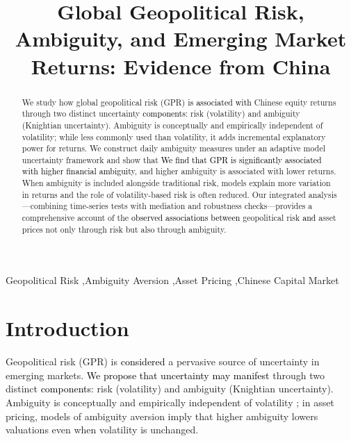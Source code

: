 \documentclass[preprint,12pt,authoryear]{elsarticle}
\begin{document}
\begin{frontmatter}

\title{Global Geopolitical Risk, Ambiguity, and Emerging Market Returns: Evidence from China}

\begin{abstract}
We study how global geopolitical risk (GPR) \textcolor{black}{is associated with} Chinese equity returns through two distinct uncertainty \textcolor{black}{components}: risk (volatility) and ambiguity (Knightian uncertainty). Ambiguity is conceptually and empirically independent of volatility; while less commonly used than volatility, it adds incremental explanatory power for returns. We construct daily ambiguity measures under an adaptive model uncertainty framework and show that \textcolor{black}{We find that GPR is significantly associated with higher financial ambiguity}, and higher ambiguity is associated with lower returns. When ambiguity is included alongside traditional risk, models explain more variation in returns and the role of volatility-based risk is often reduced. Our integrated analysis—combining time-series tests with mediation and robustness checks—provides a comprehensive account of the \textcolor{black}{observed associations between} geopolitical risk \textcolor{black}{and} asset prices not only through risk but also through ambiguity.
\end{abstract}

\begin{keyword}
Geopolitical Risk \sep Ambiguity Aversion \sep Asset Pricing \sep Chinese Capital Market 
\end{keyword}

\end{frontmatter}

\section{Introduction}

Geopolitical risk (GPR) is \textcolor{black}{considered} a pervasive source of uncertainty in emerging markets. \textcolor{black}{We propose that uncertainty may manifest} through two distinct \textcolor{black}{components}: risk (volatility) and ambiguity (Knightian uncertainty). Ambiguity is conceptually and empirically independent of volatility \citep{Knight1921, Ellsberg1961}; in asset pricing, models of ambiguity aversion \citep{Gilboa1989, Klibanoff2005} imply that higher ambiguity lowers valuations even when volatility is unchanged.
\end{document}
